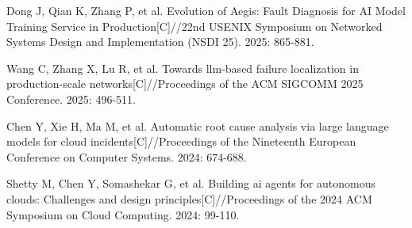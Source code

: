 {\begin{enumerate}[label={[\arabic*]}]
        \item Dong J, Qian K, Zhang P, et al. Evolution of Aegis: Fault Diagnosis for {AI} Model Training Service in Production[C]//22nd USENIX Symposium on Networked Systems Design and Implementation (NSDI 25). 2025: 865-881.
        \item Wang C, Zhang X, Lu R, et al. Towards llm-based failure localization in production-scale networks[C]//Proceedings of the ACM SIGCOMM 2025 Conference. 2025: 496-511.
        \item Chen Y, Xie H, Ma M, et al. Automatic root cause analysis via large language models for cloud incidents[C]//Proceedings of the Nineteenth European Conference on Computer Systems. 2024: 674-688.
        \item Shetty M, Chen Y, Somashekar G, et al. Building ai agents for autonomous clouds: Challenges and design principles[C]//Proceedings of the 2024 ACM Symposium on Cloud Computing. 2024: 99-110.
    \end{enumerate}
}
